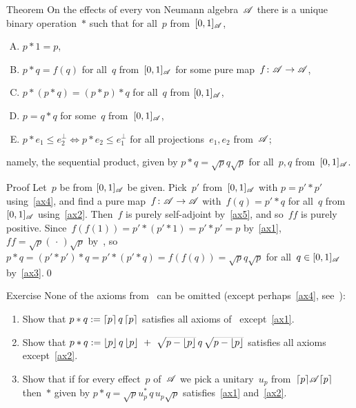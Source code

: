\documentclass[a]{subfiles}
\begin{document}
\begin{parsec}%
\begin{point}{Theorem}%
On the effects of every von Neumann algebra~$\mathscr{A}$
there is a unique binary operation~$\ast$
such that for all~$p$ from~$[0,1]_{\mathscr{A}}$,
\begin{enumerate}[A.]
\item \label{ax1}
$p\ast 1 = p$,
\item
	\label{ax2}
$p\ast q = f(q)$
for all~$q$ from~$[0,1]_{\mathscr{A}}$
for some pure map~$f\colon \mathscr{A}\to\mathscr{A}$,
\item\label{ax3}
$p\ast (p\ast q)=(p\ast p)\ast q$
for all~$q$ from $[0,1]_{\mathscr{A}}$,
\item\label{ax4}
$p=q\ast q$ for some~$q$ from~$[0,1]_{\mathscr{A}}$,
\item\label{ax5}
$p \ast e_1 \leq e_2^\perp
\iff p\ast e_2 \leq e_1^\perp$
for all projections~$e_1,e_2$ from~$\mathscr{A}$;
\end{enumerate}
namely, the sequential product,
given by
$p\ast q = \sqrt{p}q\sqrt{p}$
for all~$p, q$ from~$[0,1]_{\mathscr{A}}$.
\begin{point}{Proof}%
Let~$p$ be from $[0,1]_{\mathscr{A}}$ be given.
Pick~$p'$ from~$[0,1]_{\mathscr{A}}$
with $p = p'\ast p'$
using~\ref{ax4},
and find a pure map~$f\colon \mathscr{A}\to\mathscr{A}$
with~$f(q)=p'\ast q$ for all~$q$ from $[0,1]_{\mathscr{A}}$
using~\ref{ax2}.
Then~$f$ is purely self-adjoint by~\ref{ax5},
and so~$ff$ is purely positive.
Since~$f(f(1))=p'\ast (p'\ast 1)
= p'\ast p'=p$ by~\ref{ax1},
$ff=\sqrt{p}(\,\cdot\,)\sqrt{p}$
by~,
so $p\ast q
= (p'\ast p')\ast q
= p'\ast (p' \ast q) = f(f(q))=\sqrt{p}q\sqrt{p}$
for all~$q\in [0,1]_{\mathscr{A}}$ by~\ref{ax3}.\qed
\end{point}
\end{point}
\begin{point}{Exercise}%
None of the axioms
from~
can be omitted (except perhaps~\ref{ax4},
see~):
\begin{enumerate}
\item
Show that
$p\ast q := \left\lceil p\right\rceil q\left\lceil p\right\rceil$
satisfies all axioms of~
except~\ref{ax1}.
\item
Show that  $p\ast q := \left\lfloor p\right\rfloor q\left\lfloor p\right\rfloor\ +\ \smash{\sqrt{p-\left\lfloor p\right\rfloor}\,q\,
\sqrt{p-\left\lfloor p\right\rfloor}}$
satisfies all axioms except~\ref{ax2}.
\item
Show that if for every effect~$p$ of~$\mathscr{A}$
we pick a unitary~$u_p$ from~$\left\lceil p\right\rceil\!\mathscr{A}\!\left\lceil p\right\rceil$
then~$\ast$ given by
$p\ast q= \sqrt{p}u_p^* \,q\, u_p\sqrt{p}$
satisfies~\ref{ax1} and~\ref{ax2}.


\end{enumerate}
\end{point}
\end{parsec}
\end{document}
